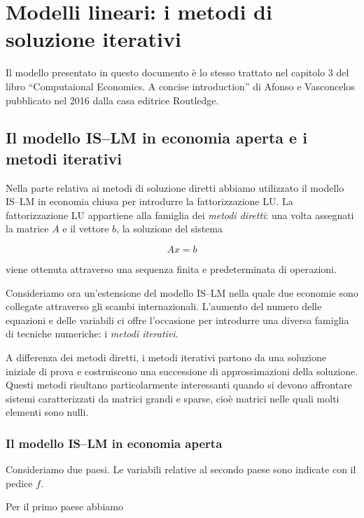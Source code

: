 
\chapter{Modelli lineari: i metodi di soluzione iterativi}
\newpage
\minitoc
\newpage

Il modello presentato in questo documento è lo stesso trattato nel capitolo 3 del libro ``Computaional Economics. A concise introduction'' di Afonso e Vasconcelos pubblicato nel 2016 dalla casa editrice Routledge.  

\section{Il modello IS--LM in economia aperta e i metodi iterativi}
\label{sec:islm-aperta-iterativi}

Nella parte relativa ai metodi di soluzione diretti abbiamo utilizzato il modello
IS--LM in economia chiusa per introdurre la fattorizzazione LU.
La fattorizzazione LU appartiene alla famiglia dei
\emph{metodi diretti}: una volta assegnati la matrice $A$ e il
vettore $b$, la soluzione del sistema

\begin{equation*}
    Ax=b
\end{equation*}

viene ottenuta attraverso una sequenza finita e predeterminata di
operazioni.

Consideriamo ora un'estensione del modello IS--LM nella quale due
economie sono collegate attraverso gli scambi internazionali.
L'aumento del numero delle equazioni e delle variabili ci offre
l'occasione per introdurre una diversa famiglia di tecniche
numeriche: i \emph{metodi iterativi}.

A differenza dei metodi diretti, i metodi iterativi partono da una
soluzione iniziale di prova e costruiscono una successione di
approssimazioni della soluzione. Questi metodi risultano
particolarmente interessanti quando si devono affrontare sistemi
caratterizzati da matrici grandi e sparse, cioè matrici nelle quali
molti elementi sono nulli.


\subsection{Il modello IS--LM in economia aperta}

Consideriamo due paesi. Le variabili relative al secondo paese
sono indicate con il pedice $f$.

Per il primo paese abbiamo

